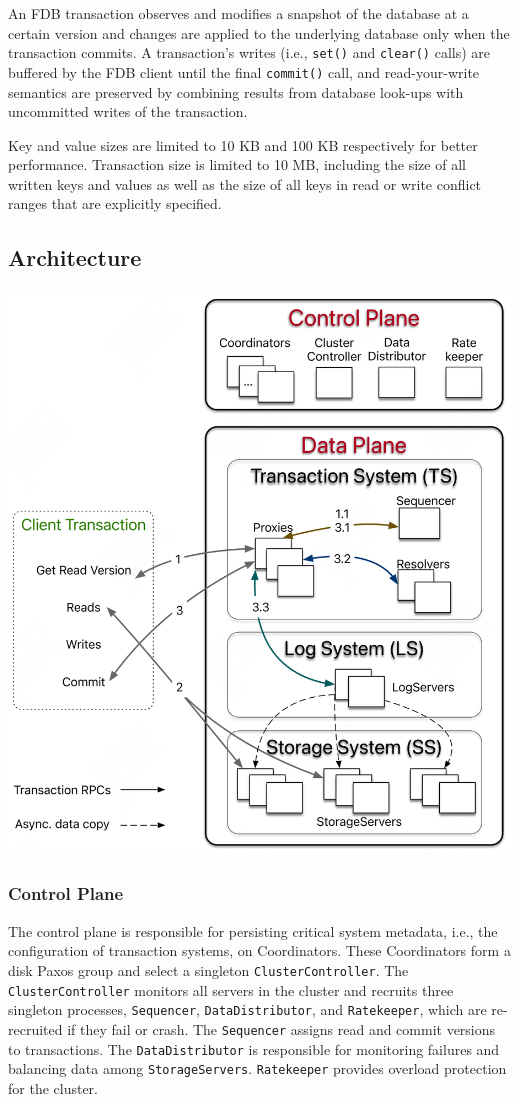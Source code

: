\documentclass[11pt]{article}
\begin{document}
An FDB transaction observes and modifies a snapshot of the database at a certain version and changes
are applied to the underlying database only when the transaction commits. A transaction’s writes
(i.e., \texttt{set()} and \texttt{clear()} calls) are buffered by the FDB client until the final \texttt{commit()} call, and
read-your-write semantics are preserved by combining results from database look-ups with uncommitted
writes of the transaction.

Key and value sizes are limited to 10 KB and 100 KB respectively for better performance. Transaction
size is limited to 10 MB, including the size of all written keys and values as well as the size of all
keys in read or write conflict ranges that are explicitly specified.
\subsection{Architecture}
\label{sec:org5123622}
\begin{center}
\includegraphics[width=.8\textwidth]{../../images/papers/108.png}
\end{center}
\subsubsection{Control Plane}
\label{sec:orgba8185c}
The control plane is responsible for persisting critical system metadata, i.e., the configuration of
transaction systems, on Coordinators. These Coordinators form a disk Paxos group and select a
singleton \texttt{ClusterController}. The \texttt{ClusterController} monitors all servers in the cluster and recruits
three singleton processes, \texttt{Sequencer}, \texttt{DataDistributor}, and \texttt{Ratekeeper}, which are re-recruited if they
fail or crash. The \texttt{Sequencer} assigns read and commit versions to transactions. The \texttt{DataDistributor} is
responsible for monitoring failures and balancing data among \texttt{StorageServers}. \texttt{Ratekeeper} provides
overload protection for the cluster.
\end{document}
